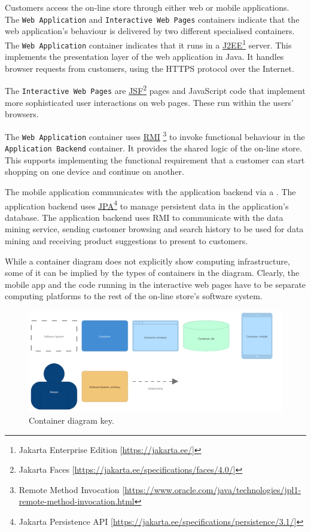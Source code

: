 Customers access the on-line store through either web or mobile applications.
The \texttt{Web Application} and \texttt{Interactive Web Pages} containers indicate
that the web application's behaviour is delivered by two different specialised containers.
The \texttt{Web Application} container indicates that it runs in a 
\href{https://jakarta.ee/}{J2EE}\footnote{Jakarta Enterprise Edition [\url{https://jakarta.ee/}]} server.
This implements the presentation layer of the web application in Java.
It handles browser requests from customers, using the HTTPS protocol over the Internet.

The \texttt{Interactive Web Pages} are
\href{https://jakarta.ee/specifications/faces/4.0/}{JSF}\footnote{Jakarta Faces [\url{https://jakarta.ee/specifications/faces/4.0/}]}
pages and JavaScript code that implement more sophisticated user interactions on web pages.
These run within the users' browsers.

The \texttt{Web Application} container uses
\href{https://www.oracle.com/java/technologies/jpl1-remote-method-invocation.html}{RMI}%
\footnote{Remote Method Invocation [\url{https://www.oracle.com/java/technologies/jpl1-remote-method-invocation.html}} 
to invoke functional behaviour in the \texttt{Application Backend} container.
It provides the shared logic of the on-line store.
This supports implementing the functional requirement that a customer can start shopping on one device and continue on another.

\noindent
The mobile application communicates with the application backend via a
.
The application backend uses \href{https://jakarta.ee/specifications/persistence/3.1/}
{JPA}\footnote{Jakarta Persistence API [\url{https://jakarta.ee/specifications/persistence/3.1/}]}
to manage persistent data in the application's database.
The application backend uses RMI to communicate with the data mining service,
sending customer browsing and search history to be used for data mining
and receiving product suggestions to present to customers.

While a container diagram does not explicitly show computing infrastructure,
some of it can be implied by the types of containers in the diagram.
Clearly, the mobile app and the code running in the interactive web pages
have to be separate computing platforms to the rest of the on-line store's software system.

\begin{figure}[h!]
    \centering
    \includegraphics[trim=22 21 98 26,clip,width=\textwidth]{images/c4/container_diagram-key.png}
    \caption{Container diagram key.}
    \label{fig:c4_container_key}
\end{figure}


